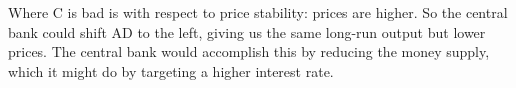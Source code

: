 \begin{enumerate}
\begin{enumerate}
Where C is bad is with respect to price stability:  prices are higher.
So the central bank could shift AD to the left, giving us the same
long-run output but lower prices.
The central bank would accomplish this by reducing the money supply,
which it might do by targeting a higher interest rate.
\end{enumerate}


%
%
%
%
%
%
%
%
%
\end{enumerate}
\setlength{\leftmargini}{\oldleftmargini}

